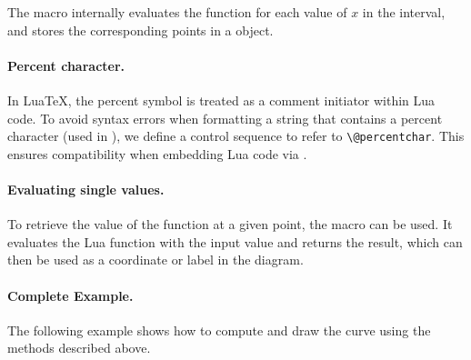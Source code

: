 The macro internally evaluates the function for each value of $x$ in the interval, and stores the corresponding points in a  object.

\paragraph{Percent character.}
In LuaTeX, the percent symbol \code{\%} is treated as a comment initiator within Lua code. To avoid syntax errors when formatting a string that contains a percent character (used in ), we define a control sequence  to refer to \verb|\@percentchar|. This ensures compatibility when embedding Lua code via .

\paragraph{Evaluating single values.}
To retrieve the value of the function at a given point, the macro  can be used. It evaluates the Lua function with the input value and returns the result, which can then be used as a coordinate or label in the diagram.

\paragraph{Complete Example.}
The following example shows how to compute and draw the curve using the methods described above.

\def\tkzfct{x*exp(-x^2)+1}

\def\tkzval#1{%
  \directlua{%
    local expr = [[\tkzfct]]
    local f = load(("return function (x)
                      return (\percentchar s) 
                    end"):format(expr), nil, 't', math)()
    tex.print(f(#1))
  }
}

\def\tkzGetPath(#1,#2,#3,#4,#5){%
  \directlua{
    local min, max, nb = #2, #3, #4
    local expr = [[#1]]
    PA.#5 = path()
    local f = load(("return function (x)
                      return (\percentchar s) 
                    end"):format(expr), nil, 't', math)()
    for t = min, max, (max - min) / nb do
      local y = f(t)
      local pt = point(t, y)
      if y == math.huge or y == -math.huge then 
        tex.print("problem") 
      end
      PA.#5:add_point(pt)
    end
  }
}
\begin{center}
\end{center}

